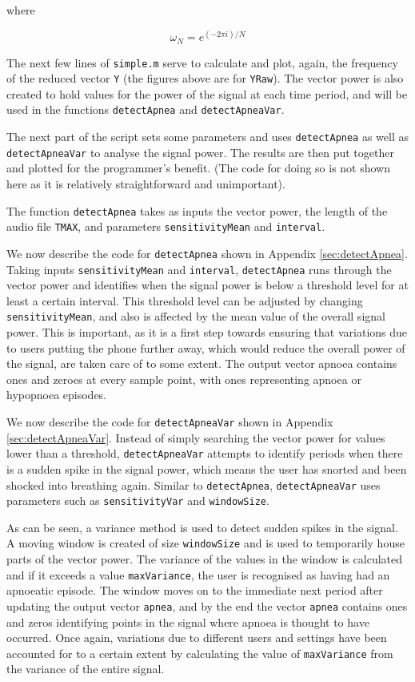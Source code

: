 where

\begin{equation}
\omega_N = e^{(-2\pi i )/N}
\end{equation}

The next few lines of \verb!simple.m! serve to calculate and plot, again, the frequency of the reduced vector \verb!Y! (the figures above are for \verb!YRaw!). The vector power is also created to hold values for the power of the signal at each time period, and will be used in the functions \verb!detectApnea! and \verb!detectApneaVar!.

The next part of the script sets some parameters and uses \verb!detectApnea! as well as \verb!detectApneaVar! to analyse the signal power. The results are then put together and plotted for the programmer's benefit. (The code for doing so is not shown here as it is relatively straightforward and unimportant).

The function \verb!detectApnea! takes as inputs the vector power, the length of the audio file \verb!TMAX!, and parameters \verb!sensitivityMean! and \verb!interval!.

We now describe the code for \verb!detectApnea! shown in Appendix \ref{sec:detectApnea}. Taking inputs \verb!sensitivityMean! and \verb!interval!, \verb!detectApnea! runs through the vector power and identifies when the signal power is below a threshold level for at least a certain interval. This threshold level can be adjusted by changing \verb!sensitivityMean!, and also is affected by the mean value of the overall signal power. This is important, as it is a first step towards ensuring that variations due to users putting the phone further away, which would reduce the overall power of the signal, are taken care of to some extent. The output vector apnoea contains ones and zeroes at every sample point, with ones representing apnoea or hypopnoea episodes.

We now describe the code for \verb!detectApneaVar! shown in Appendix \ref{sec:detectApneaVar}. Instead of simply searching the vector power for values lower than a threshold, \verb!detectApneaVar! attempts to identify periods when there is a sudden spike in the signal power, which means the user has snorted and been shocked into breathing again. Similar to \verb!detectApnea!, \verb!detectApneaVar! uses parameters such as \verb!sensitivityVar! and \verb!windowSize!.

As can be seen, a variance method is used to detect sudden spikes in the signal. A moving window is created of size \verb!windowSize! and is used to temporarily house parts of the vector power. The variance of the values in the window is calculated and if it exceeds a value \verb!maxVariance!, the user is recognised as having had an apnoeatic episode. The window moves on to the immediate next period after updating the output vector \verb!apnea!, and by the end the vector \verb!apnea! contains ones and zeros identifying points in the signal where apnoea is thought to have occurred. Once again, variations due to different users and settings have been accounted for to a certain extent by calculating the value of \verb!maxVariance! from the variance of the entire signal.

